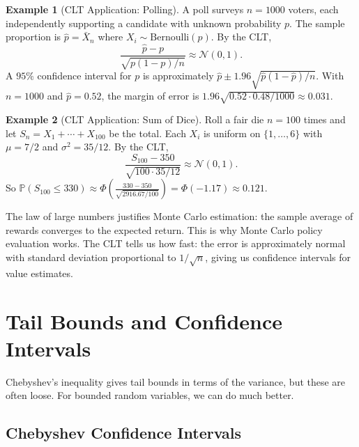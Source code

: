 \documentclass[11pt,a4paper]{article}
\theoremstyle{definition}
\newtheorem{example}{Example}[section]
\theoremstyle{plain}
\theoremstyle{remark}
\newcommand{\Prob}{\mathbb{P}}
\begin{document}
\begin{example}[CLT Application: Polling]
\label{ex:clt_polling}
A poll surveys $n = 1000$ voters, each independently supporting a candidate with unknown
probability $p$. The sample proportion is $\hat{p} = \bar{X}_n$ where $X_i \sim
\mathrm{Bernoulli}(p)$. By the CLT,
\[
    \frac{\hat{p} - p}{\sqrt{p(1-p)/n}} \approx \mathcal{N}(0, 1).
\]
A $95\%$ confidence interval for $p$ is approximately $\hat{p} \pm 1.96\sqrt{\hat{p}(1-\hat{p})/n}$.
With $n = 1000$ and $\hat{p} = 0.52$, the margin of error is
$1.96\sqrt{0.52 \cdot 0.48/1000} \approx 0.031$.
\end{example}

\begin{example}[CLT Application: Sum of Dice]
\label{ex:clt_dice}
Roll a fair die $n = 100$ times and let $S_n = X_1 + \cdots + X_{100}$ be the total.
Each $X_i$ is uniform on $\{1, \ldots, 6\}$ with $\mu = 7/2$ and
$\sigma^2 = 35/12$. By the CLT,
\[
    \frac{S_{100} - 350}{\sqrt{100 \cdot 35/12}} \approx \mathcal{N}(0,1).
\]
So $\Prob(S_{100} \leq 330) \approx \Phi\!\left(\frac{330 - 350}{\sqrt{2916.67/100}}\right)
= \Phi(-1.17) \approx 0.121$.
\end{example}

\begin{keyresult}
The law of large numbers justifies Monte Carlo estimation: the sample average of rewards
converges to the expected return. This is why Monte Carlo policy evaluation works. The CLT
tells us how fast: the error is approximately normal with standard deviation proportional to
$1/\sqrt{n}$, giving us confidence intervals for value estimates.
\end{keyresult}

\section{Tail Bounds and Confidence Intervals}
\label{sec:tail_bounds}

Chebyshev's inequality gives tail bounds in terms of the variance, but these are often loose.
For bounded random variables, we can do much better.

\subsection{Chebyshev Confidence Intervals}
\end{document}
